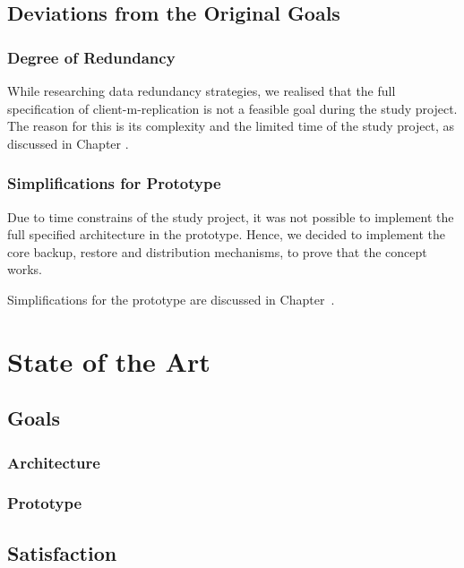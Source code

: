 \subsection{Deviations from the Original Goals}\label{sec:deviations-from-original-goals}

\subsubsection{Degree of Redundancy}
While researching data redundancy strategies, we realised that the full specification of \gls{client-m-replication} is not a feasible goal during the study project. The reason for this is its complexity and the limited time of the study project, as discussed in Chapter .

\subsubsection{Simplifications for Prototype}
Due to time constrains of the study project, it was not possible to implement the full specified architecture in the prototype. Hence, we decided to implement the core backup, restore and distribution mechanisms, to prove that the concept works.

Simplifications for the prototype are discussed in Chapter~.

\section{State of the Art}

\subsection{Goals}

\subsubsection{Architecture}

\subsubsection{Prototype}



\subsection{Satisfaction}
